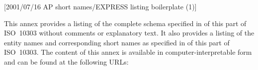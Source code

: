 [2001/07/16 AP short names/EXPRESS listing boilerplate (1)]

  This annex provides a listing of the complete \Express{} schema
specified in  of this part of ISO~10303 without comments
or explanatory text. It also provides a listing of the \Express{} entity
names and corresponding short names as specified in 
of this part of ISO~10303. The content of this annex is available
in computer-interpretable form and can be found at the following URLs:

\endinput
